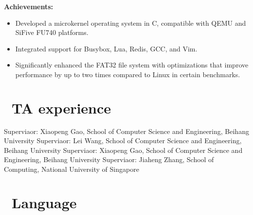 \documentclass{resume}
\begin{document}

\textbf{Achievements:}
\begin{itemize}
  \item Developed a microkernel operating system in C, compatible with QEMU and SiFive FU740 platforms.
  \item Integrated support for Busybox, Lua, Redis, GCC, and Vim.
  \item Significantly enhanced the FAT32 file system with optimizations that improve performance by up to two times compared to Linux in certain benchmarks.
\end{itemize}



\section{\faHeartO\ TA experience}
Superviaor: Xiaopeng Gao, School of Computer Science and Engineering, Beihang University
Superviaor: Lei Wang, School of Computer Science and Engineering, Beihang University
Superviaor: Xiaopeng Gao, School of Computer Science and Engineering, Beihang University
Superviaor: Jiaheng Zhang, School of Computing, National University of Singapore


\section{\faCertificate\ Language}


%
%
\end{document}
